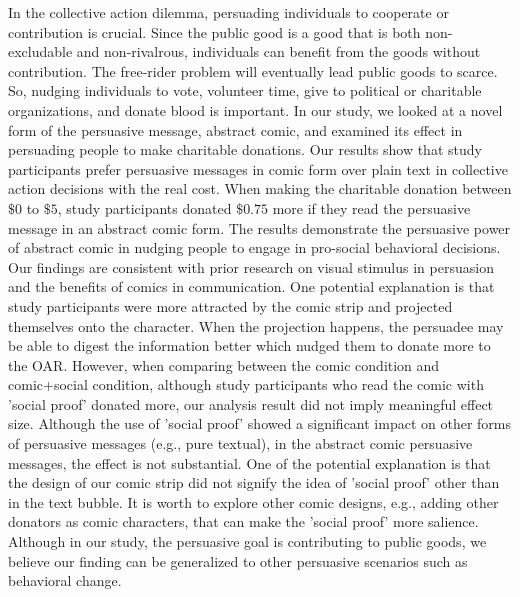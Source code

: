 In the collective action dilemma, persuading individuals to cooperate or contribution is crucial. Since the public good is a good that is both non-excludable and non-rivalrous, individuals can benefit from the goods without contribution. The free-rider problem will eventually lead public goods to scarce. So, nudging individuals to vote, volunteer time, give to political or charitable organizations, and donate blood is important. In our study, we looked at a novel form of the persuasive message, abstract comic, and examined its effect in persuading people to make charitable donations. Our results show that study participants prefer persuasive messages in comic form over plain text in collective action decisions with the real cost. When making the charitable donation between $\$0$ to $\$5$, study participants donated $\$ 0.75$ more if they read the persuasive message in an abstract comic form. The results demonstrate the persuasive power of abstract comic in nudging people to engage in pro-social behavioral decisions. Our findings are consistent with prior research on visual stimulus in persuasion and the benefits of comics in communication. One potential explanation is that study participants were more attracted by the comic strip and projected themselves onto the character. When the projection happens, the persuadee may be able to digest the information better which nudged them to donate more to the OAR. However, when comparing between the comic condition and comic+social condition, although study participants who read the comic with 'social proof' donated more, our analysis result did not imply meaningful effect size. Although the use of 'social proof' showed a significant impact on other forms of persuasive messages (e.g., pure textual), in the abstract comic persuasive messages, the effect is not substantial. One of the potential explanation is that the design of our comic strip did not signify the idea of 'social proof' other than in the text bubble. It is worth to explore other comic designs, e.g., adding other donators as comic characters, that can make the 'social proof' more salience. Although in our study, the persuasive goal is contributing to public goods, we believe our finding can be generalized to other persuasive scenarios such as behavioral change.




